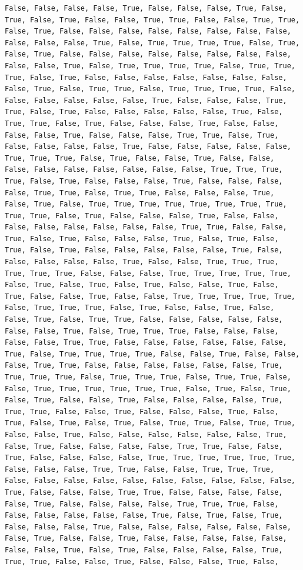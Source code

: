 \documentclass[
  letterpaper,
  DIV=11,
  numbers=noendperiod]{scrartcl}
\begin{document}
\begin{verbatim}
False, False, False, False, True, False, False, False, True, False, True, False, True, False, False, True, True, False, False, True, True, False, True, False, False, False, False, False, False, False, False, False, False, False, True, False, True, True, True, True, False, True, False, True, False, False, False, False, False, False, False, False, False, False, True, False, True, True, True, True, False, True, True, True, False, True, False, False, False, False, False, False, False, False, True, False, True, True, False, True, True, True, True, False, False, False, False, False, False, True, False, False, False, True, True, False, True, False, False, False, False, False, True, False, True, True, False, True, False, False, False, True, False, False, False, False, True, False, False, False, True, True, False, True, False, False, False, False, True, False, False, False, False, False, True, True, True, False, True, False, False, True, False, False, False, False, False, False, False, False, False, True, True, True, True, False, True, False, False, False, True, False, False, False, False, True, True, False, True, True, False, False, False, True, False, True, False, True, True, True, True, True, True, True, True, True, True, False, True, False, False, False, True, False, False, False, False, False, False, False, False, True, True, False, False, True, False, True, False, False, False, True, False, True, False, True, False, True, False, False, False, False, False, True, False, False, False, False, False, True, False, False, True, True, True, True, True, True, False, False, False, True, True, True, True, True, False, True, False, True, False, True, False, False, True, False, True, False, False, True, False, False, True, True, True, True, True, False, True, True, True, False, True, False, False, True, False, False, True, False, True, True, False, False, False, False, False, False, False, True, False, True, True, True, False, False, False, False, False, True, True, False, False, False, False, False, False, True, False, True, True, True, True, False, False, True, False, False, False, True, True, False, False, False, False, False, False, True, True, True, True, False, True, True, True, False, True, True, False, False, True, True, True, True, True, True, False, True, False, True, False, True, False, False, True, False, False, False, False, True, True, True, False, False, True, False, False, False, True, False, True, False, True, False, True, False, True, True, False, True, True, False, False, True, False, False, False, False, False, False, True, False, True, False, False, False, False, True, True, False, False, True, False, False, False, False, True, True, True, True, True, True, False, False, False, True, True, False, False, True, True, True, False, False, False, False, False, False, False, False, False, False, True, False, False, False, True, True, False, False, False, False, False, True, False, False, False, False, True, True, True, False, False, False, False, False, False, True, False, True, False, True, False, False, False, True, False, False, False, False, False, False, False, True, False, False, True, False, False, False, False, False, False, False, True, False, True, False, False, False, False, True, True, True, False, False, True, False, False, False, True, False, 
\end{verbatim}
\end{document}
